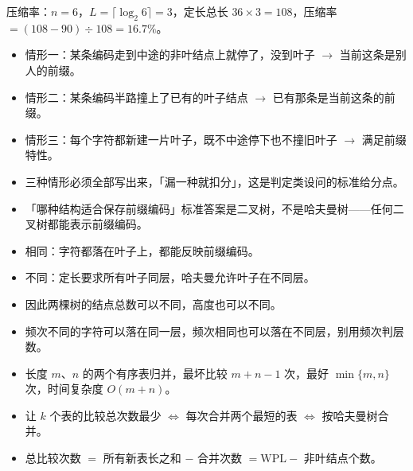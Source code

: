 \documentclass[10pt,a4paper]{ctexart}
\begin{document}
压缩率：$n=6$，$L=\lceil\log_2 6\rceil=3$，定长总长 $36\times 3=108$，压缩率 $=(108-90)\div 108=16.7\%$。


\begin{itemize}

\item 情形一：某条编码走到中途的非叶结点上就停了，没到叶子 $\to$ 当前这条是别人的前缀。

\item 情形二：某条编码半路撞上了已有的叶子结点 $\to$ 已有那条是当前这条的前缀。

\item 情形三：每个字符都新建一片叶子，既不中途停下也不撞旧叶子 $\to$ 满足前缀特性。

\item 三种情形必须全部写出来，「漏一种就扣分」，这是判定类设问的标准给分点。

\item 「哪种结构适合保存前缀编码」标准答案是二叉树，不是哈夫曼树——任何二叉树都能表示前缀编码。

\end{itemize}


\begin{itemize}

\item 相同：字符都落在叶子上，都能反映前缀编码。

\item 不同：定长要求所有叶子同层，哈夫曼允许叶子在不同层。

\item 因此两棵树的结点总数可以不同，高度也可以不同。

\item 频次不同的字符可以落在同一层，频次相同也可以落在不同层，别用频次判层数。

\end{itemize}


\begin{itemize}

\item 长度 $m$、$n$ 的两个有序表归并，最坏比较 $m+n-1$ 次，最好 $\min\{m,n\}$ 次，时间复杂度 $O(m+n)$。

\item 让 $k$ 个表的比较总次数最少 $\iff$ 每次合并两个最短的表 $\iff$ 按哈夫曼树合并。

\item 总比较次数 $=$ 所有新表长之和 $-$ 合并次数 $=\mathrm{WPL}-$ 非叶结点个数。

\end{itemize}
\end{document}
